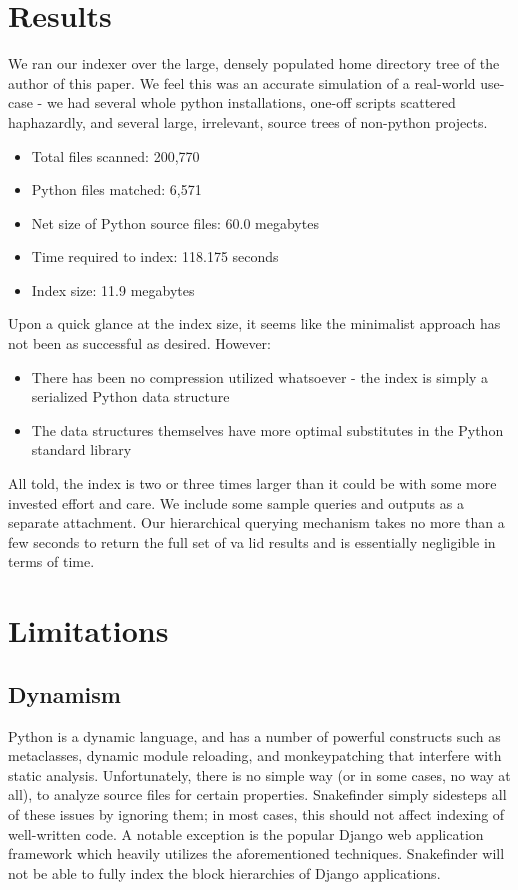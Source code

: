 \documentclass{article}
\begin{document}
\section{Results}

We ran our indexer over the large, densely populated home directory tree of the author of this paper. We feel this was an accurate simulation of a real-world use-case - we had several whole python installations, one-off scripts scattered haphazardly, and several large, irrelevant, source trees of non-python projects.

\begin{itemize}
	\item Total files scanned: 200,770
	\item Python files matched: 6,571
	\item Net size of Python source files: 60.0 megabytes
	\item Time required to index: 118.175 seconds
	\item Index size: 11.9 megabytes
	\end{itemize}

Upon a quick glance at the index size, it seems like the minimalist approach has not been as successful as desired. However:
	\begin{itemize}
	\item There has been no compression utilized whatsoever - the index is simply a serialized Python data structure
	\item The data structures themselves have more optimal substitutes in the Python standard library
	\end{itemize}
	All told, the index is two or three times larger than it could be with some more invested effort and care.
	We include some sample queries and outputs as a separate attachment. Our hierarchical querying mechanism takes no more than a few seconds
	to return the full set of va	lid results and is essentially negligible in terms of time.

\section{Limitations}
\subsection{Dynamism}
Python is a dynamic language, and has a number of powerful constructs such as metaclasses, dynamic module reloading, and monkeypatching that interfere with static analysis. Unfortunately, there is no simple way (or in some cases, no way at all), to analyze source files for certain properties. Snakefinder simply sidesteps all of these issues by ignoring them; in most cases, this should not affect indexing of well-written code.
A notable exception is the popular Django web application framework which heavily utilizes the aforementioned techniques. Snakefinder will not be able to fully index the block hierarchies of Django applications.
\end{document}

